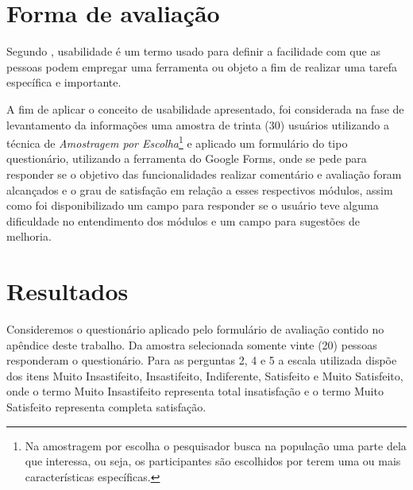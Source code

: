 \documentclass[12pt, a4paper]{report}
\begin{document}
\section{Forma de avaliação}

Segundo \cite{polson1992cognitive}, usabilidade é um termo usado para definir a facilidade com que as pessoas podem empregar uma ferramenta ou objeto a fim de realizar uma tarefa específica e importante. 

A fim de aplicar o conceito de usabilidade apresentado, foi considerada na fase de levantamento da informações uma amostra de trinta (30) usuários utilizando a técnica de \textit{Amostragem por Escolha}\footnote{ Na amostragem por escolha o pesquisador busca na população uma parte dela que interessa, ou seja, os participantes são escolhidos por terem uma ou mais características específicas.} e aplicado um formulário do tipo questionário, utilizando a ferramenta do Google Forms, onde se pede para responder se o objetivo das funcionalidades realizar comentário e avaliação foram alcançados e o  grau de satisfação em relação a esses respectivos módulos, assim como foi disponibilizado um campo para responder se o usuário teve alguma dificuldade no entendimento dos módulos e um campo para sugestões de melhoria.

\section{Resultados} 
Consideremos o questionário aplicado pelo formulário de avaliação contido no apêndice deste trabalho. Da amostra selecionada somente vinte (20) pessoas responderam o questionário.
Para as perguntas 2, 4 e 5 a escala utilizada dispõe dos itens Muito Insastifeito, Insastifeito, Indiferente, Satisfeito e Muito Satisfeito, onde o termo Muito Insastifeito representa total insatisfação e o termo Muito Satisfeito representa completa satisfação.
\end{document}
